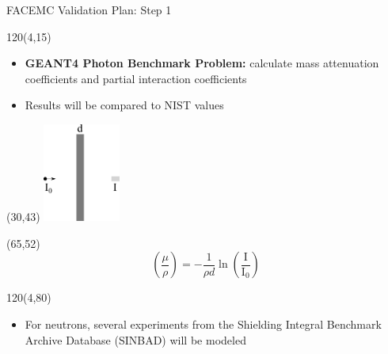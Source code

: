 \documentclass{beamer}
\begin{document}
\begin{frame}{FACEMC Validation Plan: Step 1}

  \begin{textblock}{120}(4,15)
    \begin{itemize}
      \item \textbf{GEANT4 Photon Benchmark Problem:} calculate mass 
        attenuation coefficients and partial interaction coefficients
        \medskip
      \item Results will be compared to NIST values
    \end{itemize}
  \end{textblock}
  
  \begin{textblock}{20}(30,43)
    \includegraphics[width=1.0in]{../document/chapters/code_overview/photon_benchmark_problem.pdf}
  \end{textblock}

  \begin{textblock}{20}(65,52)
    \begin{equation*}
      \left(\frac{\mu}{\rho}\right) = -\frac{1}{\rho d}
      \ln{\left(\frac{\text{I}}{\text{I}_0}\right)}
    \end{equation*}
  \end{textblock}

  \begin{textblock}{120}(4,80)
    \begin{itemize}
      \item For neutrons, several experiments from the Shielding Integral
        Benchmark Archive Database (SINBAD) will be modeled
    \end{itemize}
  \end{textblock}

\end{frame}
\end{document}
